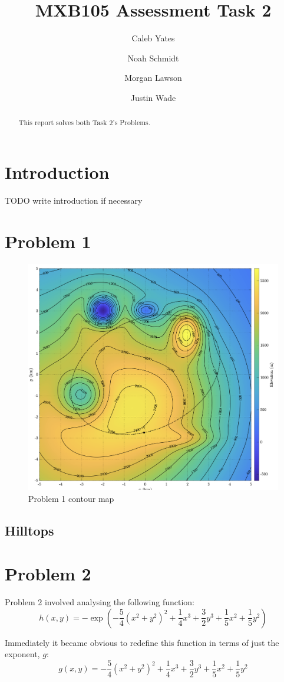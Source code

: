 \documentclass{article}
\title{MXB105 Assessment Task 2}
\author {
    Caleb Yates
    \and
    Noah Schmidt
    \and 
    Morgan Lawson
    \and
    Justin Wade
}
\begin{document}
\maketitle

\begin{abstract}
This report solves both Task 2's Problems.
\end{abstract}

\section{Introduction}

TODO write introduction if necessary

\section{Problem 1}
\begin{figure}[h]
    \centering
    \includegraphics[width=0.25\linewidth]{Problem 1.png}
    \caption{Problem 1 contour map}
    \label{fig:p1-contour-map}
\end{figure}

\subsection{Hilltops}

\subsection{}

\section {Problem 2}
Problem 2 involved analysing the following function:
\[
h \left(x, y\right) = - \exp \left(- \frac{5}{4} \left(x^{2}+y^{2}\right)^{2}+\frac{1}{4}x^{3}+\frac{3}{2}y^{3}+\frac{1}{5}x^{2}+\frac{1}{5}y^{2}\right)
\]

Immediately it became obvious to redefine this function in terms of just the exponent, $g$:
\[
g\left(x, y\right)=-\frac{5}{4}\left(x^{2}+y^{2}\right)^{2}+\frac{1}{4}x^{3}+\frac{3}{2}y^{3}+\frac{1}{5}x^{2}+\frac{1}{5}y^{2}
\]
\end{document}
